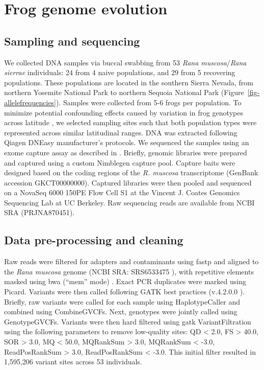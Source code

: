 \documentclass[9pt,twocolumn,twoside,lineno]{pnas-new}
\begin{document}
{\hypertarget{frog-genome-evolution-1}{%
\section*{Frog genome evolution}\label{frog-genome-evolution-1}}

\hypertarget{sampling-and-sequencing}{%
\subsection*{Sampling and sequencing}\label{sampling-and-sequencing}}

We collected DNA samples via buccal swabbing \citep{broquet2007} from 53
\emph{Rana muscosa}/\emph{Rana sierrae} individuals: 24 from 4 naive
populations, and 29 from 5 recovering populations. These populations are
located in the southern Sierra Nevada, from northern Yosemite National
Park to northern Sequoia National Park
(Figure~\ref{fig-allelefrequencies}). Samples were collected from 5-6
frogs per population. To minimize potential confounding effects caused
by variation in frog genotypes across latitude \citep{byrne2023}, we
selected sampling sites such that both population types were represented
across similar latitudinal ranges. DNA was extracted following Qiagen
DNEasy manufacturer's protocols. We sequenced the samples using an exome
capture assay as described in \citep{byrne2023}. Briefly, genomic
libraries were prepared and captured using a custom Nimblegen capture
pool. Capture baits were designed based on the coding regions of the
\emph{R. muscosa} transcriptome (GenBank accession GKCT00000000).
Captured libraries were then pooled and sequenced on a NovaSeq 6000
150PE Flow Cell S1 at the Vincent J. Coates Genomics Sequencing Lab at
UC Berkeley. Raw sequencing reads are available from NCBI SRA
(PRJNA870451).

\hypertarget{data-pre-processing-and-cleaning}{%
\subsection*{Data pre-processing and
cleaning}\label{data-pre-processing-and-cleaning}}

Raw reads were filtered for adapters and contaminants using fastp
\citep{chen2018} and aligned to the \emph{Rana muscosa} genome (NCBI
SRA: SRS6533475 \citep{hon2020}), with repetitive elements masked using
bwa (``mem'' mode) \citep{li2013}. Exact PCR duplicates were marked
using Picard. Variants were then called following GATK best practices
(v.4.2.0.0 \citep{van2020}). Briefly, raw variants were called for each
sample using HaplotypeCaller and combined using CombineGVCFs. Next,
genotypes were jointly called using GenotypeGVCFs. Variants were then
hard filtered using gatk VariantFiltration using the following
parameters to remove low-quality sites: QD \textless{} 2.0, FS
\textgreater{} 40.0, SOR \textgreater{} 3.0, MQ \textless{} 50.0,
MQRankSum \textgreater{} 3.0, MQRankSum \textless{} -3.0, ReadPosRankSum
\textgreater{} 3.0, ReadPosRankSum \textless{} -3.0. This initial filter
resulted in 1,595,206 variant sites across 53 individuals.

}
\end{document}
